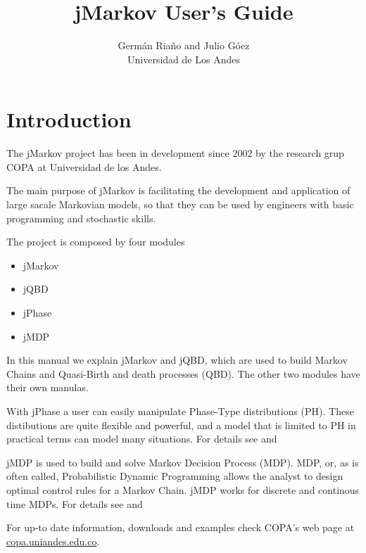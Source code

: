 \documentclass[11pt,letterpaper]{article}
\begin{document}
\title{jMarkov User's Guide}
\author{  Germ\'an Ria\~no and Julio G\'oez  \\
Universidad de Los Andes}
\date{}

\maketitle
\tableofcontents

\section{Introduction}

The jMarkov project has been in development since 2002 by the research grup COPA
at Universidad de los Andes.

The main purpose of jMarkov is facilitating the development and application of
large sacale Markovian models, so that they can be used by engineers with basic
programming and stochastic skills.

The project is composed by four modules
\begin{itemize}
	\item jMarkov
	\item jQBD
	\item jPhase
	\item jMDP
\end{itemize}

In this manual we explain jMarkov and jQBD, which are used to build Markov
Chains and Quasi-Birth and death processes (QBD). The other two modules have their own manulas.

With jPhase a user can easily manipulate Phase-Type distributions
(PH). These distibutions are quite
flexible and powerful, and a model that is limited to PH in practical terms can
model many situations. For details see \cite{pere.rian:jphaseMan} and
\cite{pere.rian:jphase}


jMDP is used to build and solve Markov Decision Process
(MDP).  MDP, or, as is often called,
Probabilistic Dynamic Programming allows the analyst to design optimal control
rules for a Markov Chain.  jMDP works for discrete and continous time MDPs.  For
details see \cite{sarm.rian:jmdpMan} and \cite{rian.sarm:jmdp}

For up-to date information, downloads and examples check COPA's web page at
\url{copa.uniandes.edu.co}.
\end{document}
